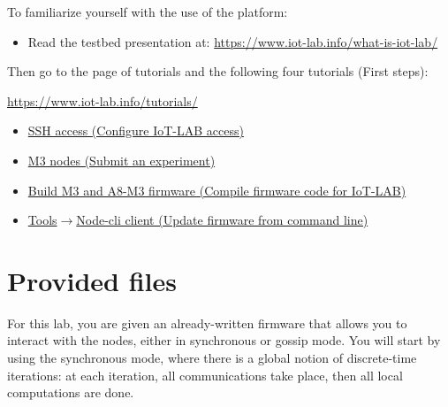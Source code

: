 \documentclass{article}
\begin{document}
To familiarize yourself with the use of the platform:
\begin{itemize}
\item Read the testbed presentation at: \url{https://www.iot-lab.info/what-is-iot-lab/}
\end{itemize}

Then go to the page of tutorials and the following four tutorials (First steps):
\begin{center} \url{https://www.iot-lab.info/tutorials/} \end{center}
\begin{itemize}
    \item \href{https://www.iot-lab.info/tutorials/configure-your-ssh-access/}{SSH access (Configure IoT-LAB access)}
    \item \href{https://www.iot-lab.info/tutorials/submit-an-experiment-with-web-portal-and-m3-nodes/}{M3 nodes (Submit an experiment)}
    \item \href{https://www.iot-lab.info/tutorials/get-compile-a-m3-firmware-code/}{Build M3 and A8-M3 firmware (Compile firmware code for IoT-LAB)}
    \item \href{https://www.iot-lab.info/tutorials/node-cli-client/}{Tools$\to$Node-cli client (Update firmware from command line)}
\end{itemize}

\section{Provided files}

For this lab, you are given
an already-written firmware that allows you to interact with the nodes,
either in synchronous or gossip mode.
You will start by using the synchronous mode,
where there is a global notion of discrete-time iterations: at each iteration,
all communications take place, then all local computations are done.

\end{document}
